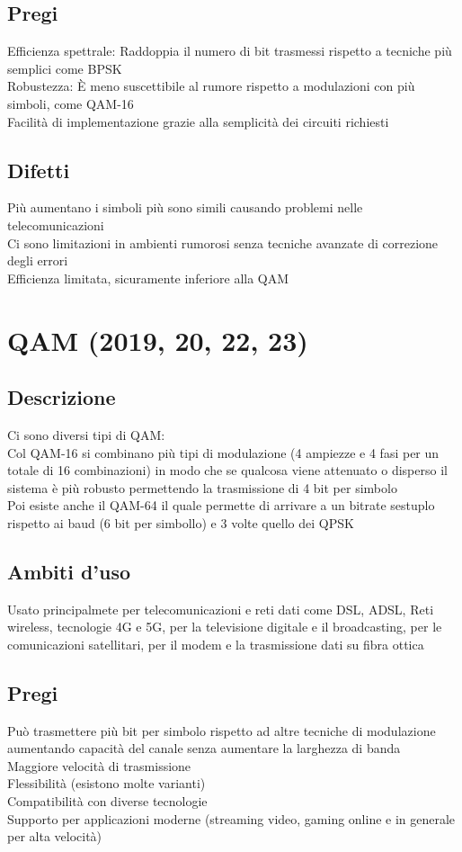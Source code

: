 \documentclass[10pt,oneside,a4paper]{article}
\begin{document}
\subsection{Pregi}
Efficienza spettrale: Raddoppia il numero di bit trasmessi rispetto a tecniche più semplici come BPSK\\
Robustezza: È meno suscettibile al rumore rispetto a modulazioni con più simboli, come QAM-16\\
Facilità di implementazione grazie alla semplicità dei circuiti richiesti\\
\subsection{Difetti}
Più aumentano i simboli più sono simili causando problemi nelle telecomunicazioni\\
Ci sono limitazioni in ambienti rumorosi senza tecniche avanzate di correzione degli errori\\
Efficienza limitata, sicuramente inferiore alla QAM
\section{QAM (2019, 20, 22, 23)}
\subsection{Descrizione}
Ci sono diversi tipi di QAM:\\
Col QAM-16 si combinano più tipi di modulazione (4 ampiezze e 4 fasi per un totale di 16 combinazioni) in modo che se qualcosa viene attenuato o disperso il sistema è più robusto permettendo la trasmissione di 4 bit per simbolo\\
Poi esiste anche il QAM-64 il quale permette di arrivare a un bitrate sestuplo rispetto ai baud (6 bit per simbollo) e 3 volte quello dei QPSK
\subsection{Ambiti d'uso}
Usato principalmete per telecomunicazioni e reti dati come DSL, ADSL, Reti wireless, tecnologie 4G e 5G, per la televisione digitale e il broadcasting, per le comunicazioni satellitari, per il modem e la trasmissione dati su fibra ottica
\subsection{Pregi}
Può trasmettere più bit per simbolo rispetto ad altre tecniche di modulazione aumentando capacità del canale senza aumentare la larghezza di banda\\
Maggiore velocità di trasmissione\\
Flessibilità (esistono molte varianti)\\
Compatibilità con diverse tecnologie\\
Supporto per applicazioni moderne (streaming video, gaming online e in generale per alta velocità)
\end{document}
